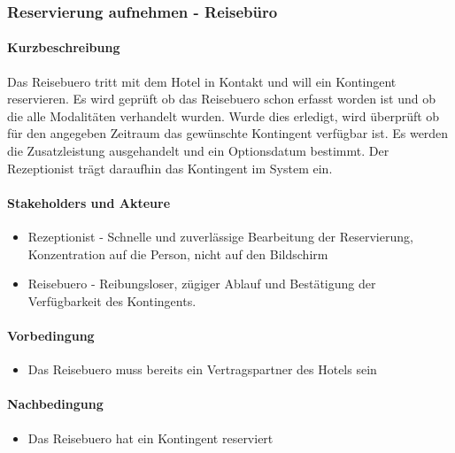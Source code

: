 \subsubsection{Reservierung aufnehmen - Reisebüro}

\paragraph{Kurzbeschreibung}  

Das \Gls{Reisebuero} tritt mit dem Hotel in Kontakt und will ein \Gls{Kontingent} reservieren. Es wird geprüft ob das \Gls{Reisebuero} schon erfasst worden ist und ob die alle Modalitäten verhandelt wurden. Wurde dies erledigt, wird überprüft ob für den angegeben Zeitraum das gewünschte \Gls{Kontingent} verfügbar ist. Es werden die \Gls{Zusatzleistung} ausgehandelt und ein \Gls{Optionsdatum} bestimmt. Der \Gls{Rezeptionist} trägt daraufhin das \Gls{Kontingent} im System ein.

\paragraph{Stakeholders und Akteure}
\begin{itemize}
	\item \Gls{Rezeptionist} - Schnelle und zuverlässige Bearbeitung der \Gls{Reservierung}, Konzentration auf die Person, nicht auf den Bildschirm
	\item \Gls{Reisebuero} - Reibungsloser, zügiger Ablauf und Bestätigung der Verfügbarkeit des Kontingents.
\end{itemize}

\paragraph{Vorbedingung}
\begin{itemize}
	\item Das \Gls{Reisebuero} muss bereits ein Vertragspartner des Hotels sein
\end{itemize}

\paragraph{Nachbedingung}
\begin{itemize}
	\item Das \Gls{Reisebuero} hat ein \Gls{Kontingent} reserviert
\end{itemize}

